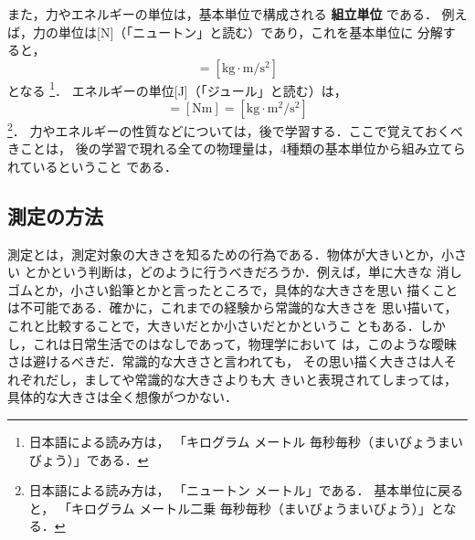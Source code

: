                 また，力やエネルギーの単位は，基本単位で構成される \textbf{組立単位} である．
                例えば，力の単位は[N]（「ニュートン」と読む）であり，これを基本単位に
                分解すると，
                \begin{equation*}
                    [\mbox{N}] = [\mbox{kg}\cdot\mbox{m}/\mbox{s}^{2}]
                \end{equation*}
                となる
                    \footnote{
                        日本語による読み方は，
                        「キログラム メートル 毎秒毎秒（まいびょうまいびょう）」である．
                    }．
                エネルギーの単位[J]（「ジュール」と読む）は，
                \begin{equation*}
                    [\mbox{J}] = [\mbox{Nm}] = [\mbox{kg}\cdot\mbox{m}^{2}/\mbox{s}^{2}]
                \end{equation*}
                    \footnote{
                        日本語による読み方は，
                        「ニュートン メートル」である．
                        基本単位に戻ると，
                        「キログラム メートル二乗 毎秒毎秒（まいびょうまいびょう）」となる．
                    }．
                力やエネルギーの性質などについては，後で学習する．ここで覚えておくべきことは，
                後の学習で現れる全ての物理量は，4種類の基本単位から組み立てられているということ
                である．

        \subsection{測定の方法}
            測定とは，測定対象の大きさを知るための行為である．物体が大きいとか，小さい
            とかという判断は，どのように行うべきだろうか．例えば，単に大きな
            消しゴムとか，小さい鉛筆とかと言ったところで，具体的な大きさを思い
            描くことは不可能である．確かに，これまでの経験から常識的な大きさを
            思い描いて，これと比較することで，大きいだとか小さいだとかというこ
            ともある．しかし，これは日常生活でのはなしであって，物理学において
            は，このような曖昧さは避けるべきだ．常識的な大きさと言われても，
            その思い描く大きさは人それぞれだし，ましてや常識的な大きさよりも大
            きいと表現されてしまっては，具体的な大きさは全く想像がつかない．

